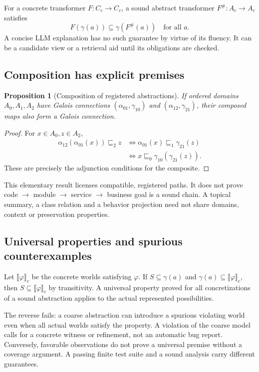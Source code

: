 \documentclass[11pt]{article}
\newtheorem{proposition}{Proposition}\newtheorem{definition}{Definition}
\begin{document}
For a concrete transformer $F:C_c\to C_c$, a sound abstract transformer $F^\#:A_c\to A_c$ satisfies
\begin{equation}
F(\gamma(a))\subseteq\gamma(F^\#(a))\quad\text{for all }a.
\end{equation}
A concise LLM explanation has no such guarantee by virtue of its fluency. It can be a candidate view or a retrieval aid until its obligations are checked.

\subsection{Composition has explicit premises}
\begin{proposition}[Composition of registered abstractions]
If ordered domains $A_0,A_1,A_2$ have Galois connections $(\alpha_{01},\gamma_{10})$ and $(\alpha_{12},\gamma_{21})$, their composed maps also form a Galois connection.
\end{proposition}
\begin{proof}
For $x\in A_0,z\in A_2$,
\begin{align*}
\alpha_{12}(\alpha_{01}(x))\sqsubseteq_2 z
&\Longleftrightarrow\alpha_{01}(x)\sqsubseteq_1\gamma_{21}(z)\\
&\Longleftrightarrow x\sqsubseteq_0\gamma_{10}(\gamma_{21}(z)).
\end{align*}
These are precisely the adjunction conditions for the composite.
\end{proof}
This elementary result licenses compatible, registered paths. It does not prove code $\to$ module $\to$ service $\to$ business goal is a sound chain. A topical summary, a class relation and a behavior projection need not share domains, context or preservation properties.

\subsection{Universal properties and spurious counterexamples}
Let $\llbracket\varphi\rrbracket_c$ be the concrete worlds satisfying $\varphi$. If $S\subseteq\gamma(a)$ and $\gamma(a)\subseteq\llbracket\varphi\rrbracket_c$, then $S\subseteq\llbracket\varphi\rrbracket_c$ by transitivity. A universal property proved for all concretizations of a sound abstraction applies to the actual represented possibilities.

The reverse fails: a coarse abstraction can introduce a spurious violating world even when all actual worlds satisfy the property. A violation of the coarse model calls for a concrete witness or refinement, not an automatic bug report. Conversely, favorable observations do not prove a universal premise without a coverage argument. A passing finite test suite and a sound analysis carry different guarantees.
\end{document}

